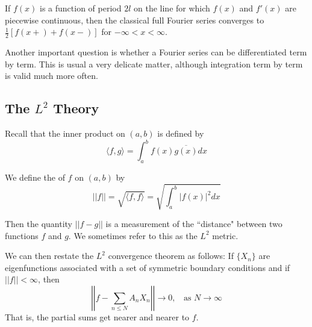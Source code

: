 \documentclass[12pt, a4paper, oneside, openright, titlepage]{book}
\begin{document}
\begin{thm}
    If $f(x)$ is a function of period $2l$ on the line for which $f(x)$ and $f'(x)$ are piecewise continuous, then the classical full Fourier series converges to $\frac{1}{2}[f(x+)+f(x-)]$ for $-\infty < x < \infty$.
\end{thm}

Another important question is whether a Fourier series can be differentiated term by term. This is usual a very delicate matter, although integration term by term is valid much more often.

\subsection{The \texorpdfstring{$L^2$}{L2} Theory}

Recall that the inner product on $(a,b)$ is defined by \begin{equation*}
    \langle f, g\rangle = \int_a^bf(x)\overline{g(x)}dx
\end{equation*}

\begin{defn}
    We define the  of $f$ on $(a,b)$ by \begin{equation*}
        ||f|| = \sqrt{\langle f,f\rangle} = \sqrt{\int_a^b|f(x)|^2dx}
    \end{equation*}
\end{defn}

Then the quantity $||f-g||$ is a measurement of the ``distance" between two functions $f$ and $g$. We sometimes refer to this as the $L^2$ metric. 

We can then restate the $L^2$ convergence theorem as follows: If $\{X_n\}$ are eigenfunctions associated with a set of symmetric boundary conditions and if $||f|| < \infty$, then \begin{equation}
    \left|\left|f - \sum_{n\leq N}A_nX_n\right|\right|\rightarrow 0,\;\;\text{ as }N\rightarrow \infty
\end{equation}
That is, the partial sums get nearer and nearer to $f$.
\end{document}
